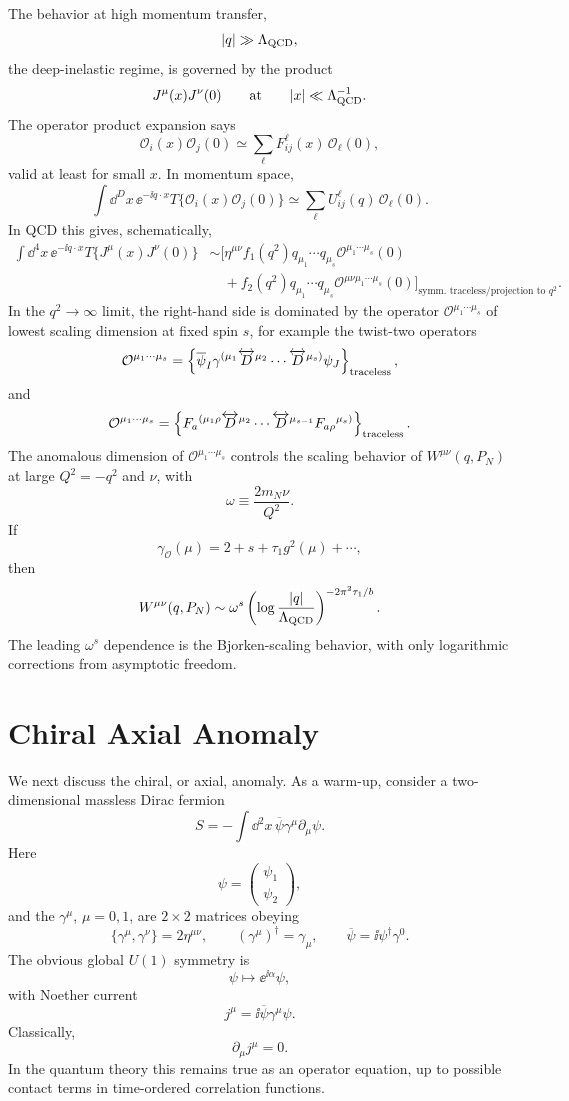 The behavior at high momentum transfer,
\[
  |q|\gg \Lambda_{\rm QCD},
\]
the deep-inelastic regime, is governed by the product
\[
  J^\mu(x)J^\nu(0)
  \qquad\text{at}\qquad
  |x|\ll \Lambda_{\rm QCD}^{-1}.
\]
The operator product expansion says
\[
  \mathcal O_i(x)\mathcal O_j(0)
  \simeq
  \sum_\ell F_{ij}^{\ell}(x)\,\mathcal O_\ell(0),
\]
valid at least for small \(x\).  In momentum space,
\[
  \int\dd^D x\,\ee^{-\ii q\cdot x}
  T\{\mathcal O_i(x)\mathcal O_j(0)\}
  \simeq
  \sum_\ell U_{ij}^{\ell}(q)\,\mathcal O_\ell(0).
\]
In QCD this gives, schematically,
\[
\begin{aligned}
  \int\dd^4x\,\ee^{-\ii q\cdot x}T\{J^\mu(x)J^\nu(0)\}
  &\sim
  \bigl[
    \eta^{\mu\nu}f_1(q^2)
    q_{\mu_1}\cdots q_{\mu_s}
    \mathcal O^{\mu_1\cdots\mu_s}(0)
\\
  &\quad+
    f_2(q^2)
    q_{\mu_1}\cdots q_{\mu_s}
    \mathcal O^{\mu\nu\mu_1\cdots\mu_s}(0)
  \bigr]_{\text{symm. traceless/projection to }q^2}.
\end{aligned}
\]
In the \(q^2\to\infty\) limit, the right-hand side is dominated by the
operator \(\mathcal O^{\mu_1\cdots\mu_s}\) of lowest scaling dimension at
fixed spin \(s\), for example the twist-two operators
\[
  \mathcal O^{\mu_1\cdots\mu_s}
  =
  \left\{
    \overline\psi_I\gamma^{(\mu_1}
    \overleftrightarrow D^{\mu_2}\cdots
    \overleftrightarrow D^{\mu_s)}
    \psi_J
  \right\}_{\rm traceless},
\]
and
\[
  \mathcal O^{\mu_1\cdots\mu_s}
  =
  \left\{
    F_a{}^{(\mu_1\rho}
    \overleftrightarrow D^{\mu_2}\cdots
    \overleftrightarrow D^{\mu_{s-1}}
    F_{a\rho}{}^{\mu_s)}
  \right\}_{\rm traceless}.
\]
The anomalous dimension of \(\mathcal O^{\mu_1\cdots\mu_s}\) controls the
scaling behavior of \(W^{\mu\nu}(q,P_N)\) at large \(Q^2=-q^2\) and
\(\nu\), with
\[
  \omega\equiv\frac{2m_N\nu}{Q^2}.
\]
If
\[
  \gamma_{\mathcal O}(\mu)
  =
  2+s+\tau_1 g^2(\mu)+\cdots,
\]
then
\[
  W^{\mu\nu}(q,P_N)
  \sim
  \omega^s
  \left(
    \log\frac{|q|}{\Lambda_{\rm QCD}}
  \right)^{-2\pi^2\tau_1/b}.
\]
The leading \(\omega^s\) dependence is the Bjorken-scaling behavior, with
only logarithmic corrections from asymptotic freedom.

\section{Chiral Axial Anomaly}

We next discuss the chiral, or axial, anomaly.  As a warm-up, consider a
two-dimensional massless Dirac fermion
\[
  S=-\int\dd^2x\,\overline\psi\gamma^\mu\partial_\mu\psi .
\]
Here
\[
  \psi=\begin{pmatrix}\psi_1\\ \psi_2\end{pmatrix},
\]
and the \(\gamma^\mu\), \(\mu=0,1\), are \(2\times2\) matrices obeying
\[
  \{\gamma^\mu,\gamma^\nu\}=2\eta^{\mu\nu},
  \qquad
  (\gamma^\mu)^\dagger=\gamma_\mu,
  \qquad
  \overline\psi=\ii\psi^\dagger\gamma^0 .
\]
The obvious global \(U(1)\) symmetry is
\[
  \psi\longmapsto \ee^{\ii\alpha}\psi ,
\]
with Noether current
\[
  j^\mu=\ii\overline\psi\gamma^\mu\psi .
\]
Classically,
\[
  \partial_\mu j^\mu=0.
\]
In the quantum theory this remains true as an operator equation, up to
possible contact terms in time-ordered correlation functions.

